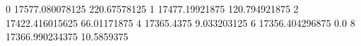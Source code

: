 0 17577.080078125 220.67578125
1 17477.19921875 120.794921875
2 17422.416015625 66.01171875
4 17365.4375 9.033203125
6 17356.404296875 0.0
8 17366.990234375 10.5859375

